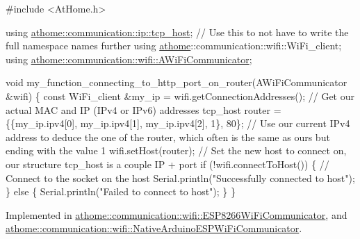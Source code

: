 \begin{DoxyCode}
\textcolor{preprocessor}{#include <AtHome.h>}

\textcolor{keyword}{using} \mbox{\hyperlink{structathome_1_1communication_1_1ip_1_1s__host}{athome::communication::ip::tcp\_host}}; \textcolor{comment}{// Use this to not have to
       write}
the full \textcolor{keyword}{namespace }names further using
\mbox{\hyperlink{namespaceathome}{athome}}::communication::wifi::WiFi\_client; using
\mbox{\hyperlink{classathome_1_1communication_1_1wifi_1_1_a_wi_fi_communicator}{athome::communication::wifi::AWiFiCommunicator}};

void my\_function\_connecting\_to\_http\_port\_on\_router(AWiFiCommunicator &wifi)
\{ \textcolor{keyword}{const} WiFi\_client &my\_ip = wifi.getConnectionAddresses(); \textcolor{comment}{// Get our}
actual MAC and IP (IPv4 or IPv6) addresses tcp\_host router =
\{\{my\_ip.ipv4[0], my\_ip.ipv4[1], my\_ip.ipv4[2], 1\}, 80\}; \textcolor{comment}{// Use our current}
IPv4 address to deduce the one of the router, which often is the same as
ours but ending with the value 1 wifi.setHost(router); \textcolor{comment}{// Set the new host}
to connect on, our structure tcp\_host is a couple IP + port \textcolor{keywordflow}{if}
(!wifi.connectToHost()) \{ \textcolor{comment}{// Connect to the socket on the host}
    Serial.println(\textcolor{stringliteral}{"Successfully connected to host"});
  \} \textcolor{keywordflow}{else} \{
    Serial.println(\textcolor{stringliteral}{"Failed to connect to host"});
  \}
\}
\end{DoxyCode}
 

Implemented in \mbox{\hyperlink{classathome_1_1communication_1_1wifi_1_1_e_s_p8266_wi_fi_communicator_a159a93b350df135daa967665c9e53e2f}{athome\+::communication\+::wifi\+::\+E\+S\+P8266\+Wi\+Fi\+Communicator}}, and \mbox{\hyperlink{classathome_1_1communication_1_1wifi_1_1_native_arduino_e_s_p_wi_fi_communicator_ab3f6a0e1b9d3be98a876f95dde97976b}{athome\+::communication\+::wifi\+::\+Native\+Arduino\+E\+S\+P\+Wi\+Fi\+Communicator}}.

\mbox{\label{classathome_1_1communication_1_1_a_network_communicator_a025b7fbe9b3c4452fcf1925d766324eb}} 
